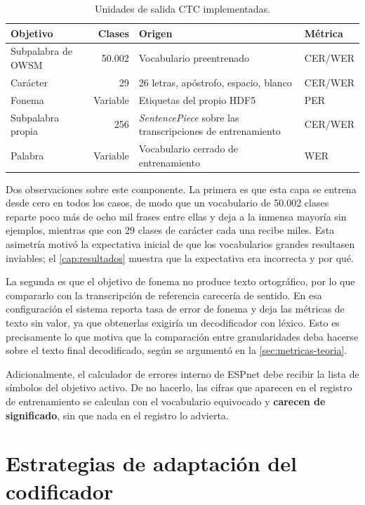\begin{table}[H]
  \centering
  \caption{Unidades de salida CTC implementadas.}
  \label{tab:objetivos-ctc}
  \small
  \begin{tabular}{l r p{5.3cm} l}
    \toprule
    \textbf{Objetivo} & \textbf{Clases} & \textbf{Origen} & \textbf{Métrica} \\
    \midrule
    Subpalabra de OWSM   & 50.002 & Vocabulario preentrenado           & CER/WER \\
    Carácter             & 29     & 26 letras, apóstrofo, espacio, blanco & CER/WER \\
    Fonema               & Variable & Etiquetas del propio HDF5        & PER \\
    Subpalabra propia    & 256 & \textit{SentencePiece} sobre las transcripciones de entrenamiento & CER/WER \\
    Palabra              & Variable & Vocabulario cerrado de entrenamiento & WER \\
    \bottomrule
  \end{tabular}
\end{table}

Dos observaciones sobre este componente. La primera es que esta capa se entrena desde cero en todos los casos, de modo que un vocabulario de 50.002 clases reparte poco más de ocho mil frases entre ellas y deja a la inmensa mayoría sin ejemplos, mientras que con 29 clases de carácter cada una recibe miles. Esta asimetría motivó la expectativa inicial de que los vocabularios grandes resultasen inviables; el \cref{cap:resultados} muestra que la expectativa era incorrecta y por qué.

La segunda es que el objetivo de fonema no produce texto ortográfico, por lo que compararlo con la transcripción de referencia carecería de sentido. En esa configuración el sistema reporta tasa de error de fonema y deja las métricas de texto sin valor, ya que obtenerlas exigiría un decodificador con léxico. Esto es precisamente lo que motiva que la comparación entre granularidades deba hacerse sobre el texto final decodificado, según se argumentó en la \cref{sec:metricas-teoria}.

Adicionalmente, el calculador de errores interno de ESPnet debe recibir la lista de símbolos del objetivo activo. De no hacerlo, las cifras que aparecen en el registro de entrenamiento se calculan con el vocabulario equivocado y \textbf{carecen de significado}, sin que nada en el registro lo advierta.

\section{Estrategias de adaptación del codificador}
\label{sec:estrategias-adaptacion}

